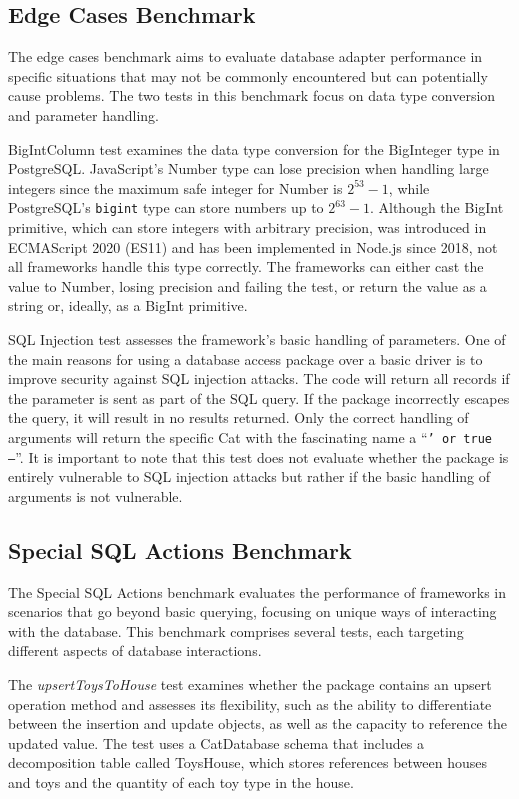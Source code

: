 \subsection{Edge Cases Benchmark}

The edge cases benchmark aims to evaluate database adapter performance in
specific situations that may not be commonly encountered but can potentially
cause problems. The two tests in this benchmark focus on data type conversion
and parameter handling.

BigIntColumn test examines the data type conversion for the BigInteger type in
PostgreSQL. JavaScript's Number type can lose precision when handling large
integers since the maximum safe integer for Number is \(2^{53} - 1\), while
PostgreSQL's \texttt{bigint} type can store numbers up to \(2^{63} - 1\).
Although the BigInt primitive, which can store integers with arbitrary
precision, was introduced in ECMAScript 2020 (ES11) and has been implemented in
Node.js since 2018, not all frameworks handle this type correctly. The
frameworks can either cast the value to Number, losing precision and failing the
test, or return the value as a string or, ideally, as a BigInt primitive.

SQL Injection test assesses the framework's basic handling of parameters. One of
the main reasons for using a database access package over a basic driver is to
improve security against SQL injection attacks. The code will return all records
if the parameter is sent as part of the SQL query. If the package incorrectly
escapes the query, it will result in no results returned. Only the correct
handling of arguments will return the specific Cat with the fascinating name a
\enquote{\texttt{' or true --}}. It is important to note that this test does not
evaluate whether the package is entirely vulnerable to SQL injection attacks but
rather if the basic handling of arguments is not vulnerable.

\subsection{Special SQL Actions Benchmark}

The Special SQL Actions benchmark evaluates the performance of frameworks in
scenarios that go beyond basic querying, focusing on unique ways of interacting
with the database. This benchmark comprises several tests, each targeting
different aspects of database interactions.

The \textit{upsertToysToHouse} test examines whether the package contains an
upsert operation method and assesses its flexibility, such as the ability to
differentiate between the insertion and update objects, as well as the capacity
to reference the updated value. The test uses a CatDatabase schema that includes
a decomposition table called ToysHouse, which stores references between houses
and toys and the quantity of each toy type in the house.

